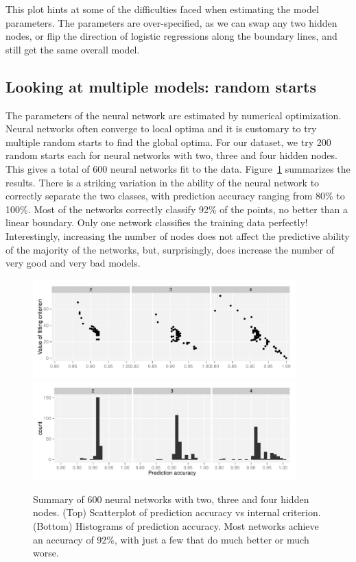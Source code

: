 \documentclass[preprint]{imsart}
\begin{document}
This plot hints at some of the difficulties faced when estimating the model parameters.  The parameters are over-specified, as we can swap any two hidden nodes, or flip the direction of logistic regressions along the boundary lines, and still get the same overall model.

\subsection{Looking at multiple models: random starts}
\label{sub:starts}

The parameters of the neural network are estimated by numerical optimization.  Neural networks often converge to local optima and it is customary to try multiple random starts to find the global optima.  For our dataset, we  try 200 random starts each for neural networks with two, three and four hidden nodes.  This gives a total of 600 neural networks fit to the data.   Figure~\ref{fig:nnet-many} summarizes the results. There is a striking variation in the ability of the neural network to correctly separate the two classes, with prediction accuracy ranging from 80\% to 100\%.  Most of the networks correctly classify 92\% of the points, no better than a linear boundary.  Only one network classifies the training data perfectly!  Interestingly, increasing the number of nodes does not affect the predictive ability of the majority of the networks, but, surprisingly, does increase the number of very good and very bad models.

\begin{figure}[htbp]
  \centering
    \includegraphics[width=4in]{nnet-value-accuracy}
    \includegraphics[width=4in]{nnet-accuracy}
  \caption{Summary of 600 neural networks with two, three and four hidden nodes.  (Top) Scatterplot of prediction accuracy vs internal criterion.  (Bottom) Histograms of prediction accuracy.  Most networks achieve an accuracy of 92\%, with just a few that do much better or much worse.}
  \label{fig:nnet-many}
\end{figure}
\end{document}
